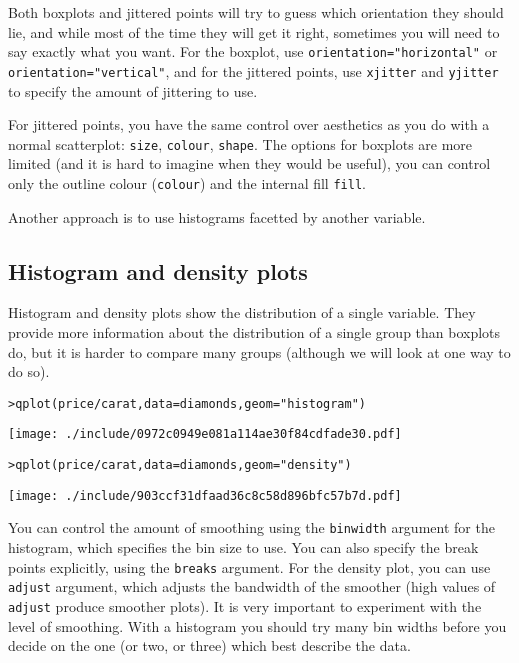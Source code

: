 Both boxplots and jittered points will try to guess which orientation they should lie, and while most of the time they will get it right, sometimes you will need to say exactly what you want.  For the boxplot, use {\tt orientation="horizontal"} or {\tt orientation="vertical"}, and for the jittered points, use {\tt xjitter} and {\tt yjitter} to specify the amount of jittering to use. 

For jittered points, you have the same control over aesthetics as you do with a normal scatterplot: {\tt size}, {\tt colour}, {\tt shape}.  The options for boxplots are more limited (and it is hard to imagine when they would be useful), you can control only the outline colour ({\tt colour}) and the internal fill {\tt fill}.

Another approach is to use histograms facetted by another variable.

\subsection{Histogram and density plots}\label{sub:density}

Histogram and density plots show the distribution of a single variable.  They provide more information about the distribution of a single group than boxplots do, but it is harder to compare many groups (although we will look at one way to do so).

\begin{alltt}
> qplot(price/carat, data = diamonds, geom = "histogram")
\end{alltt}
\texttt{[image: ./include/0972c0949e081a114ae30f84cdfade30.pdf]}
\begin{alltt}

> qplot(price/carat, data = diamonds, geom = "density")
\end{alltt}
\texttt{[image: ./include/903ccf31dfaad36c8c58d896bfc57b7d.pdf]}
\begin{alltt}

\end{alltt}

You can control the amount of smoothing using the {\tt binwidth} argument for the histogram, which specifies the bin size to use.  You can also specify the break points explicitly, using the {\tt breaks} argument.  For the density plot, you can use {\tt adjust} argument, which adjusts the bandwidth of the smoother (high values of {\tt adjust} produce smoother plots).  It is very important to experiment with the level of smoothing.  With a histogram you should try many bin widths before you decide on the one (or two, or three) which best describe the data.

